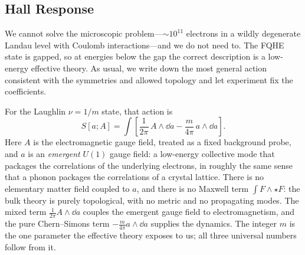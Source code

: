 \subsection{Hall Response}
\label{subsec:hall-response}

We cannot solve the microscopic problem---$\sim 10^{11}$ electrons in a wildly degenerate Landau level with Coulomb interactions---and we do not need to. The FQHE state is gapped, so at energies below the gap the correct description is a low-energy effective theory. As usual, we write down the most general action consistent with the symmetries and allowed topology and let experiment fix the coefficients.

For the Laughlin $\nu=1/m$ state, that action \cite{ZhangHanssonKivelson1989FQHE} is
\begin{equation}
  S[a;A]
  =
  \int\left[
  \frac{1}{2\pi}\,A\wedge\dd a
  -
  \frac{m}{4\pi}\,a\wedge\dd a
  \right].
  \label{eq:fqhe-action}
\end{equation}
Here $A$ is the electromagnetic gauge field, treated as a fixed background probe, and $a$ is an \emph{emergent} $U(1)$ gauge field: a low-energy collective mode that packages the correlations of the underlying electrons, in roughly the same sense that a phonon packages the correlations of a crystal lattice. There is no elementary matter field coupled to $a$, and there is no Maxwell term $\int F\wedge\star F$: the bulk theory is purely topological, with no metric and no propagating modes. The mixed term $\frac{1}{2\pi}A\wedge\dd a$ couples the emergent gauge field to electromagnetism, and the pure Chern--Simons term $-\frac{m}{4\pi}a\wedge\dd a$ supplies the dynamics. The integer $m$ is the one parameter the effective theory exposes to us; all three universal numbers follow from it.

